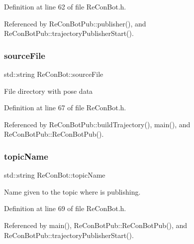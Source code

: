 Definition at line 62 of file Re\+Con\+Bot.\+h.



Referenced by Re\+Con\+Bot\+Pub\+::publisher(), and Re\+Con\+Bot\+Pub\+::trajectory\+Publisher\+Start().

\mbox{\label{class_re_con_bot_a65cf4bed9bbabd92e1265d05507e0945}} 
\subsubsection{\texorpdfstring{source\+File}{sourceFile}}
{\footnotesize\ttfamily std\+::string Re\+Con\+Bot\+::source\+File\hspace{0.3cm}{\ttfamily [inherited]}}

File directory with pose data 

Definition at line 67 of file Re\+Con\+Bot.\+h.



Referenced by Re\+Con\+Bot\+Pub\+::build\+Trajectory(), main(), and Re\+Con\+Bot\+Pub\+::\+Re\+Con\+Bot\+Pub().

\mbox{\label{class_re_con_bot_a1d91d2ea8c0f16340440357906fb9ebf}} 
\subsubsection{\texorpdfstring{topic\+Name}{topicName}}
{\footnotesize\ttfamily std\+::string Re\+Con\+Bot\+::topic\+Name\hspace{0.3cm}{\ttfamily [inherited]}}

Name given to the topic where is publishing. 

Definition at line 69 of file Re\+Con\+Bot.\+h.



Referenced by main(), Re\+Con\+Bot\+Pub\+::\+Re\+Con\+Bot\+Pub(), and Re\+Con\+Bot\+Pub\+::trajectory\+Publisher\+Start().

\mbox{\label{class_re_con_bot_aba20d307ac1b2e6b22f96da83a0d937d}} 
